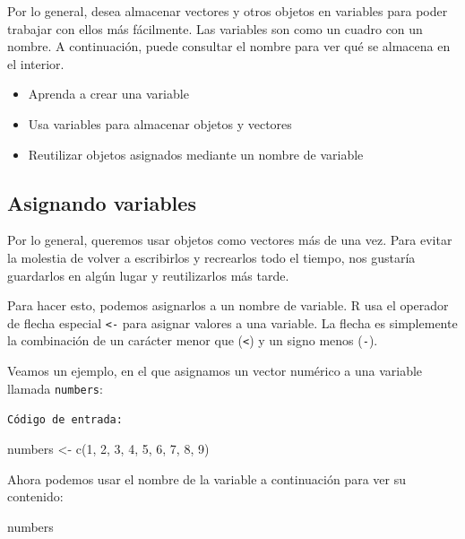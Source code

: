 \documentclass[
]{book}
\newenvironment{Shaded}{\begin{snugshade}}{\end{snugshade}}
\newcommand{\DecValTok}[1]{\textcolor[rgb]{0.00,0.00,0.81}{#1}}
\newcommand{\FunctionTok}[1]{\textcolor[rgb]{0.00,0.00,0.00}{#1}}
\newcommand{\NormalTok}[1]{#1}
\newcommand{\OtherTok}[1]{\textcolor[rgb]{0.56,0.35,0.01}{#1}}
\providecommand{\tightlist}{%
  \setlength{\itemsep}{0pt}\setlength{\parskip}{0pt}}
\begin{document}
Por lo general, desea almacenar vectores y otros objetos en variables para poder trabajar con ellos más fácilmente. Las variables son como un cuadro con un nombre. A continuación, puede consultar el nombre para ver qué se almacena en el interior.

\begin{itemize}
\tightlist
\item
  Aprenda a crear una variable
\item
  Usa variables para almacenar objetos y vectores
\item
  Reutilizar objetos asignados mediante un nombre de variable
\end{itemize}

\hypertarget{asignando-variables}{%
\subsection{Asignando variables}\label{asignando-variables}}

Por lo general, queremos usar objetos como vectores más de una vez. Para evitar la molestia de volver a escribirlos y recrearlos todo el tiempo, nos gustaría guardarlos en algún lugar y reutilizarlos más tarde.

Para hacer esto, podemos asignarlos a un nombre de variable. R usa el operador de flecha especial \texttt{\textless{}-} para asignar valores a una variable. La flecha es simplemente la combinación de un carácter menor que (\texttt{\textless{}}) y un signo menos (\texttt{-}).

Veamos un ejemplo, en el que asignamos un vector numérico a una variable llamada \texttt{numbers}:

\texttt{Código\ de\ entrada:}

\begin{Shaded}
\begin{Highlighting}[]
\NormalTok{numbers }\OtherTok{\textless{}{-}} \FunctionTok{c}\NormalTok{(}\DecValTok{1}\NormalTok{, }\DecValTok{2}\NormalTok{, }\DecValTok{3}\NormalTok{, }\DecValTok{4}\NormalTok{, }\DecValTok{5}\NormalTok{, }\DecValTok{6}\NormalTok{, }\DecValTok{7}\NormalTok{, }\DecValTok{8}\NormalTok{, }\DecValTok{9}\NormalTok{) }
\end{Highlighting}
\end{Shaded}

Ahora podemos usar el nombre de la variable a continuación para ver su contenido:

\begin{Shaded}
\begin{Highlighting}[]
\NormalTok{numbers}
\end{Highlighting}
\end{Shaded}
\end{document}
